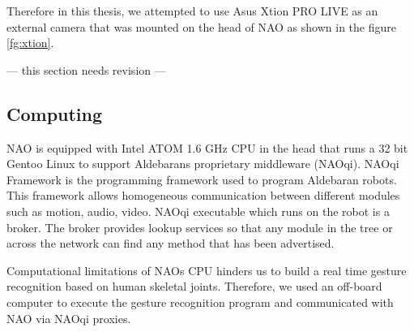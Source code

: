 

Therefore in this thesis, we attempted to use Asus Xtion PRO LIVE as an external camera that was mounted on the head of NAO as shown in the figure \ref{fg:xtion}. 



--- this section needs revision ---

\subsection{Computing} NAO is equipped with Intel ATOM 1.6 GHz CPU in the head that runs a 32 bit Gentoo Linux to support Aldebarans proprietary middleware (NAOqi). NAOqi Framework is the programming framework used to program Aldebaran robots. This framework allows homogeneous communication between different modules such as motion, audio, video. NAOqi executable which runs on the robot is a broker. The broker provides lookup services so that any module in the tree or across the network can find any method that has been advertised.



Computational limitations of NAOs CPU hinders us to build a real time gesture recognition based on human skeletal joints. Therefore, we used an off-board computer to execute the gesture recognition program and communicated with NAO via NAOqi proxies. 
